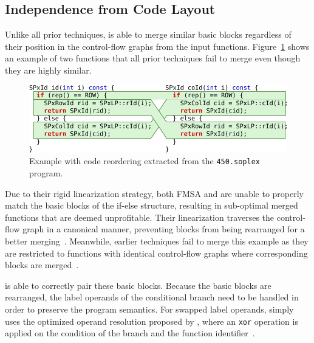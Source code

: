 \subsection{Independence from Code Layout}
Unlike all prior techniques, {\ProjName} is able to merge similar basic blocks regardless of their position in the control-flow graphs from the input functions.
Figure~\ref{fig:reordering-example} shows an example of  two functions that all prior techniques fail to merge even though they are highly similar. 

\begin{figure}[h]
  \centering
  \includegraphics[width=0.95\linewidth]{src/lctes21/figs/soplex-example-one-column.pdf}
  \caption{Example with code reordering extracted from the \texttt{450.soplex} program.}
  \label{fig:reordering-example}
\end{figure}


Due to their rigid linearization strategy, both FMSA and {\SOAName} are unable to properly match the basic blocks of the if-else structure, resulting in sub-optimal merged functions that are deemed unprofitable.
Their linearization traverses the control-flow graph in a canonical manner, preventing blocks from being rearranged for a better merging~\cite{rocha19,rocha20}.
Meanwhile, earlier techniques fail to merge this example as they are restricted to functions with identical control-flow graphs where corresponding blocks are merged~\cite{livska14,edler14,llvm-fm}.

{\ProjName} is able to correctly pair these basic blocks.
Because the basic blocks are rearranged, the label operands of the conditional branch need to be handled in order to preserve the program semantics.
For swapped label operands, {\ProjName} simply uses the optimized operand resolution proposed by {\SOAName}, where an \texttt{xor} operation is applied on the condition of the branch and the function identifier~\cite{rocha20}.


